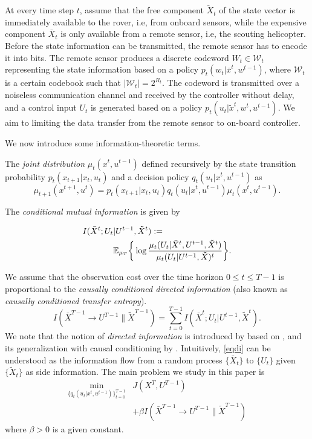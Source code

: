 At every time step $t$, assume that the free component $\tilde{X}_t$ of the state vector is immediately available to the rover, i.e, from onboard sensors, while the expensive component $\bar{X}_t$ is only available from a remote sensor, i.e, the scouting helicopter. Before the state information can be transmitted, the remote sensor has to encode it into bits. The remote sensor produces a discrete codeword $W_t\in\mathcal{W}_t$ representing the state information based on a policy $p_t(w_t|\bar{x}^t, w^{t-1})$, where $\mathcal{W}_t$ is a certain codebook such that $|\mathcal{W}_t|=2^{R_t}$. The codeword is transmitted over a noiseless communication channel and received by the controller without delay, and a control input $U_t$ is generated based on a policy $p_t(u_t|\tilde{x}^t, w^t, u^{t-1})$. We aim to limiting the data transfer from the remote sensor to on-board controller. 

 We now introduce some information-theoretic terms. 

The \emph{joint distribution} $\mu_{t}(x^{t}, u^{t-1})$ defined recursively by the state transition probability $p_t(x_{t+1}|x_t, u_t)$ and a decision policy $q_t(u_t|x^t, u^{t-1})$ as
\[
\mu_{t+1}(x^{t+1}, u^t)=p_t(x_{t+1}|x_t, u_t)q_t(u_t|x^t, u^{t-1})\mu_t(x^t, u^{t-1}).
\]


 The \emph{conditional mutual information} is given by 

\begin{align*}
I  (\bar{X}^t;U_t & \vert U^{t-1},\tilde{X}^{t}) := \nonumber \\ &\mathbb{E}_{\mu_T}\bigg\{\log\frac{\mu_{t}(U_t|\bar{X}^{t},U^{t-1},\tilde{X}^t)}{\mu_{t}(U_t\vert U^{t-1}, \tilde{X})^t}\bigg\}.
\end{align*}

We assume that the observation cost over the time horizon $0\leq t\leq T-1$ is proportional to the \emph{causally conditioned directed information} (also known as \emph{causally conditioned transfer entropy}).
\begin{equation}
\label{eqdi}
I(\bar{X}^{T-1}\rightarrow U^{T-1}\| \tilde{X}^{T-1})=\sum_{t=0}^{T-1} I(\bar{X}^t; U_t|U^{t-1},\tilde{X}^t).
\end{equation}
We note that the notion of \emph{directed information} is introduced by \cite{massey1990causality} based on \cite{marko1973bidirectional}, and its generalization with causal conditioning by \cite{kramer1998causal}. Intuitively, \eqref{eqdi} can be understood as the information flow from a random process $\{\bar{X}_t\}$ to $\{U_t\}$ given $\{\tilde{X}_t\}$ as side information.
The main problem we study in this paper is
\begin{align}
\min_{\{q_t(u_t|x^t,u^{t-1})\}_{t=0}^{T-1}} & J(X^T, U^{T-1}) \nonumber \\
&+\beta I(\bar{X}^{T-1}\rightarrow U^{T-1}\| \tilde{X}^{T-1}) \label{eqmainproblem}
\end{align}
where $\beta>0$ is a given constant.


